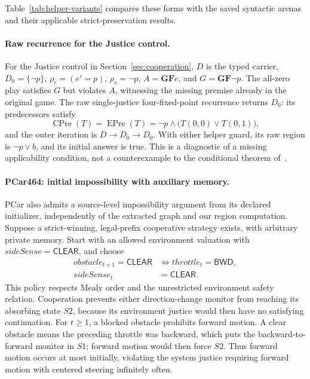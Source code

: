 \documentclass[11pt]{article}
\begin{document}
Table~\ref{tab:helper-variants} compares these forms with the saved
syntactic arenas and their applicable strict-preservation results.


\paragraph{Raw recurrence for the Justice control.}
For the Justice control in Section~\ref{sec:cooperation}, $D$ is the typed carrier,
$D_0=\{\neg p\}$, $\rho_e=(e'=p)$, $\rho_s=\neg p$,
$A=\mathbf G\mathbf F e$, and $G=\mathbf G\mathbf F\neg p$.
The all-zero play satisfies $G$ but violates $A$, witnessing the missing premise already in the original game. The raw single-justice four-fixed-point recurrence returns $D_0$: its predecessors satisfy
\[
\operatorname{CPre}(T)=\operatorname{EPre}(T)=
\neg p\land\bigl(T(0,0)\lor T(0,1)\bigr),
\]
and the outer iteration is $D\rightarrow D_0\rightarrow D_0$. With either helper guard, its raw region is $\neg p\lor b$, and its initial answer is true. This is a diagnostic of a missing applicability condition, not a counterexample to the conditional theorem of~\cite{friendly}.


\paragraph{PCar464: initial impossibility with auxiliary memory.}

PCar also admits a source-level impossibility argument from its declared initializer, independently of the extracted graph and our region computation. Suppose a strict-winning, legal-prefix cooperative strategy exists, with arbitrary private memory. Start with an allowed environment valuation with $\mathit{sideSense}=\mathsf{CLEAR}$, and choose
\[
 \begin{aligned}
 \mathit{obstacle}_{t+1}=\mathsf{CLEAR}
 &\iff \mathit{throttle}_{t}=\mathsf{BWD},\\
 \mathit{sideSense}_{t}&=\mathsf{CLEAR}.
 \end{aligned}
\]
This policy respects Mealy order and the unrestricted environment safety relation. Cooperation prevents either direction-change monitor from reaching its absorbing state $S2$, because its environment justice would then have no satisfying continuation. For $t\geq1$, a blocked obstacle prohibits forward motion. A clear obstacle means the preceding throttle was backward, which puts the backward-to-forward monitor in $S1$; forward motion would then force $S2$. Thus forward motion occurs at most initially, violating the system justice requiring forward motion with centered steering infinitely often.
\end{document}
